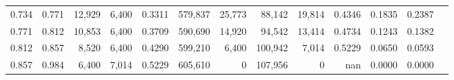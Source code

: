 \begin{tabular}{rrrrrrrrrrrrr}
0.734 & 0.771 &  12,929 & 6,400 &                                     0.3311 & 579,837 &  25,773 &  88,142 &  19,814 & 0.4346 & 0.1835 & 0.2387 \\
0.771 & 0.812 &  10,853 & 6,400 &                                     0.3709 & 590,690 &  14,920 &  94,542 &  13,414 & 0.4734 & 0.1243 & 0.1382 \\
0.812 & 0.857 &   8,520 & 6,400 &                                     0.4290 & 599,210 &   6,400 & 100,942 &   7,014 & 0.5229 & 0.0650 & 0.0593 \\
0.857 & 0.984 &   6,400 & 7,014 &                                     0.5229 & 605,610 &       0 & 107,956 &       0 &    nan & 0.0000 & 0.0000 \\
\bottomrule
\end{tabular}
